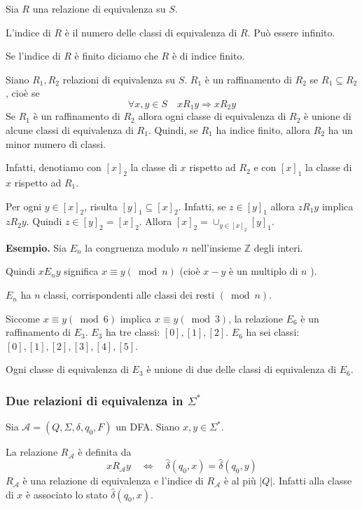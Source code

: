 Sia $R$ una relazione di equivalenza su $S$.

L'indice di $R$ è il numero delle classi di equivalenza di $R$. Può essere infinito.

Se l'indice di $R$ è finito diciamo che $R$ è di indice finito.

Siano $R_{1}, R_{2}$ relazioni di equivalenza su $S$.
$R_{1}$ è un raffinamento di $R_{2}$ se $R_{1} \subseteq R_{2}$, cioè se
$$
\forall x, y \in S \quad x R_{1} y \Rightarrow x R_{2} y
$$
Se $R_{1}$ è un raffinamento di $R_{2}$ allora ogni classe di equivalenza di $R_{2}$ è unione di alcune classi di equivalenza di $R_{1}$. Quindi, se $R_{1}$ ha indice finito, allora $R_{2}$ ha un minor numero di classi.

Infatti, denotiamo con $[x]_{2}$ la classe di $x$ rispetto ad $R_{2}$ e con $[x]_{1}$ la classe di $x$ rispetto ad $R_{1}$.

Per ogni $y \in[x]_{2}$, risulta $[y]_{1} \subseteq[x]_{2}$. Infatti, se $z \in[y]_{1}$ allora $z R_{1} y$ implica $z R_{2} y$. Quindi $z \in[y]_{2}=[x]_{2}$.
Allora $[x]_{2}=\cup_{y \in[x]_{2}}[y]_{1}$.

\vspace{5mm}

\textbf{Esempio.} Sia $E_{n}$ la congruenza modulo $n$ nell'insieme $\mathbb{Z}$ degli interi.

Quindi $x E_{n} y$ significa $x \equiv y(\bmod n)$
(cioè $x-y$ è un multiplo di $n$ ).

$E_{n}$ ha $n$ classi, corrispondenti alle classi dei resti $(\bmod n)$.

Siccome $x \equiv y(\bmod 6)$ implica $x \equiv y(\bmod 3)$, la relazione $E_{6}$ è un raffinamento di $E_{3}$.
$E_{3}$ ha tre classi: $[0],[1],[2] .$
$E_{6}$ ha sei classi: $[0],[1],[2],[3],[4],[5]$.

Ogni classe di equivalenza di $E_{3}$ è unione di due delle classi di equivalenza di $E_{6}$.

\subsubsection{Due relazioni di equivalenza in $\Sigma^*$}

Sia $\mathcal{A}=\left(Q, \Sigma, \delta, q_{0}, F\right)$ un DFA. Siano $x, y \in \Sigma^{*}$.

La relazione $R_{\mathcal{A}}$ è definita da
$$
x R_{\mathcal{A}} y \quad \Leftrightarrow \quad \hat{\delta}\left(q_{0}, x\right)=\hat{\delta}\left(q_{0}, y\right)
$$
$R_{\mathcal{A}}$ è una relazione di equivalenza e l'indice di $R_{\mathcal{A}}$ è al più $|Q|$. Infatti alla classe di $x$ è associato lo stato $\hat{\delta}\left(q_{0}, x\right)$.


